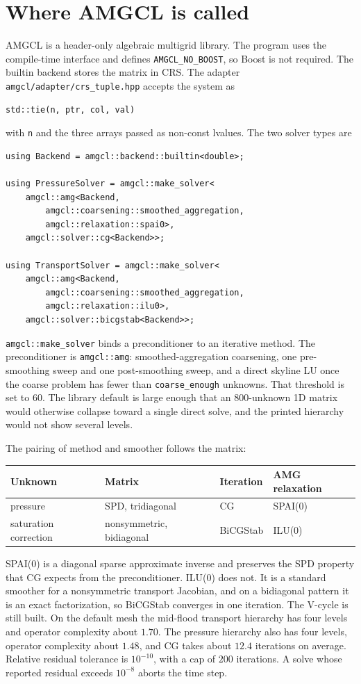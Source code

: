 \documentclass[11pt]{article}
\begin{document}
\section{Where AMGCL is called}

AMGCL is a header-only algebraic multigrid library.
The program uses the compile-time interface and defines \texttt{AMGCL\_NO\_BOOST}, so Boost is not required.
The builtin backend stores the matrix in CRS.
The adapter \texttt{amgcl/adapter/crs\_tuple.hpp} accepts the system as
\begin{lstlisting}
std::tie(n, ptr, col, val)
\end{lstlisting}
with \texttt{n} and the three arrays passed as non-const lvalues.
The two solver types are
\begin{lstlisting}
using Backend = amgcl::backend::builtin<double>;

using PressureSolver = amgcl::make_solver<
    amgcl::amg<Backend,
        amgcl::coarsening::smoothed_aggregation,
        amgcl::relaxation::spai0>,
    amgcl::solver::cg<Backend>>;

using TransportSolver = amgcl::make_solver<
    amgcl::amg<Backend,
        amgcl::coarsening::smoothed_aggregation,
        amgcl::relaxation::ilu0>,
    amgcl::solver::bicgstab<Backend>>;
\end{lstlisting}
\texttt{amgcl::make\_solver} binds a preconditioner to an iterative method.
The preconditioner is \texttt{amgcl::amg}: smoothed-aggregation coarsening, one pre-smoothing sweep and one post-smoothing sweep, and a direct skyline LU once the coarse problem has fewer than \texttt{coarse\_enough} unknowns.
That threshold is set to $60$.
The library default is large enough that an $800$-unknown 1D matrix would otherwise collapse toward a single direct solve, and the printed hierarchy would not show several levels.

The pairing of method and smoother follows the matrix:
\begin{center}
\begin{tabular}{@{}llll@{}}
\toprule
Unknown & Matrix & Iteration & AMG relaxation \\
\midrule
pressure & SPD, tridiagonal & CG & SPAI(0) \\
saturation correction & nonsymmetric, bidiagonal & BiCGStab & ILU(0) \\
\bottomrule
\end{tabular}
\end{center}
SPAI(0) is a diagonal sparse approximate inverse and preserves the SPD property that CG expects from the preconditioner.
ILU(0) does not.
It is a standard smoother for a nonsymmetric transport Jacobian, and on a bidiagonal pattern it is an exact factorization, so BiCGStab converges in one iteration.
The V-cycle is still built.
On the default mesh the mid-flood transport hierarchy has four levels and operator complexity about $1.70$.
The pressure hierarchy also has four levels, operator complexity about $1.48$, and CG takes about $12.4$ iterations on average.
Relative residual tolerance is $10^{-10}$, with a cap of $200$ iterations.
A solve whose reported residual exceeds $10^{-8}$ aborts the time step.
\end{document}
